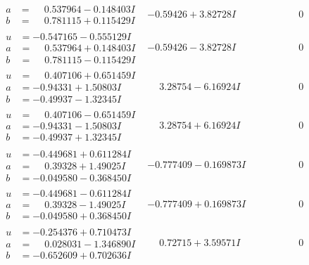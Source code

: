 \documentclass[1p]{elsarticle_modified}
\theoremstyle{definition}
\begin{document}
$$\begin{array}{c|c|c}
\begin{aligned}
a &= \phantom{-}0.537964 - 0.148403 I \\
b &= \phantom{-}0.781115 + 0.115429 I\end{aligned}
 & -0.59426 + 3.82728 I & \phantom{-0.000000 } 0 \\ \hline\begin{aligned}
u &= -0.547165 - 0.555129 I \\
a &= \phantom{-}0.537964 + 0.148403 I \\
b &= \phantom{-}0.781115 - 0.115429 I\end{aligned}
 & -0.59426 - 3.82728 I & \phantom{-0.000000 } 0 \\ \hline\begin{aligned}
u &= \phantom{-}0.407106 + 0.651459 I \\
a &= -0.94331 + 1.50803 I \\
b &= -0.49937 - 1.32345 I\end{aligned}
 & \phantom{-}3.28754 - 6.16924 I & \phantom{-0.000000 } 0 \\ \hline\begin{aligned}
u &= \phantom{-}0.407106 - 0.651459 I \\
a &= -0.94331 - 1.50803 I \\
b &= -0.49937 + 1.32345 I\end{aligned}
 & \phantom{-}3.28754 + 6.16924 I & \phantom{-0.000000 } 0 \\ \hline\begin{aligned}
u &= -0.449681 + 0.611284 I \\
a &= \phantom{-}0.39328 + 1.49025 I \\
b &= -0.049580 - 0.368450 I\end{aligned}
 & -0.777409 - 0.169873 I & \phantom{-0.000000 } 0 \\ \hline\begin{aligned}
u &= -0.449681 - 0.611284 I \\
a &= \phantom{-}0.39328 - 1.49025 I \\
b &= -0.049580 + 0.368450 I\end{aligned}
 & -0.777409 + 0.169873 I & \phantom{-0.000000 } 0 \\ \hline\begin{aligned}
u &= -0.254376 + 0.710473 I \\
a &= \phantom{-}0.028031 - 1.346890 I \\
b &= -0.652609 + 0.702636 I\end{aligned}
 & \phantom{-}0.72715 + 3.59571 I & \phantom{-0.000000 } 0 \\ \hline\begin{aligned}

\end{aligned}
\end{array}$$
\end{document}
